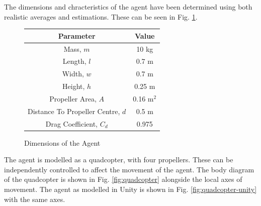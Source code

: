 \documentclass[12pt]{article}
\begin{document}
The dimensions and chracteristics of the agent have been determined using both realistic averages \cite{Figliozzi} and estimations. These can be seen in Fig. \ref{fig:dimensions}.

\begin{figure}[H]
    \centering
    \begin{tabular}{| c | c |} 
    \hline
    Parameter & Value \\ 
    \hline
    Mass, $m$ & 10 kg \\
    \hline
    Length, $l$ & 0.7 m \\
    \hline
    Width, $w$ & 0.7 m \\
    \hline
    Height, $h$ & 0.25 m \\
    \hline
    Propeller Area, $A$ & 0.16 m$^2$ \\
    \hline
    Distance To Propeller Centre, $d$ & 0.5 m \\
    \hline
    Drag Coefficient, $C_d$ & 0.975 \\
    \hline
    \end{tabular}
    \caption{Dimensions of the Agent}
    \label{fig:dimensions}
\end{figure}

The agent is modelled as a quadcopter, with four propellers. These can be independently controlled to affect the movement of the agent. The body diagram of the quadcopter is shown in Fig. \ref{fig:quadcopter} alongside the local axes of movement. The agent as modelled in Unity is shown in Fig. \ref{fig:quadcopter-unity} with the same axes.
\end{document}
